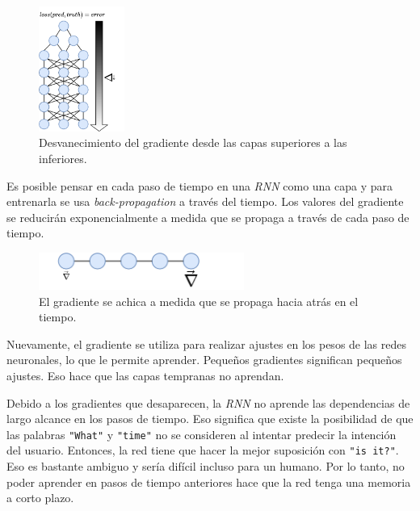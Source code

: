 \documentclass[a4paper,12pt]{article}
\begin{document}
\begin{figure}[H]
	\begin{center}				
		\includegraphics[width=0.25\textwidth]{vanishing4.png}
		\caption{Desvanecimiento del gradiente desde las capas superiores a las inferiores.}
		\label{fig:rnnvanishing4}
	\end{center}
\end{figure}

Es posible pensar en cada paso de tiempo en una \textit{RNN} como una capa y para entrenarla se usa \textit{back-propagation} a través del tiempo. Los valores del gradiente se reducirán exponencialmente a medida que se propaga a través de cada paso de tiempo.

\begin{figure}[H]
	\begin{center}				
		\includegraphics[width=0.6\textwidth]{vanishing5.png}
		\caption{El gradiente se achica a medida que se propaga hacia atrás en el tiempo.}
		\label{fig:rnnvanishing5}
	\end{center}
\end{figure}

Nuevamente, el gradiente se utiliza para realizar ajustes en los pesos de las redes neuronales, lo que le permite aprender. Pequeños gradientes significan pequeños ajustes. Eso hace que las capas tempranas no aprendan.

Debido a los gradientes que desaparecen, la \textit{RNN} no aprende las dependencias de largo alcance en los pasos de tiempo. Eso significa que existe la posibilidad de que las palabras \texttt{"What"} y \texttt{"time"} no se consideren al intentar predecir la intención del usuario. Entonces, la red tiene que hacer la mejor suposición con \texttt{"is it?"}. Eso es bastante ambiguo y sería difícil incluso para un humano. Por lo tanto, no poder aprender en pasos de tiempo anteriores hace que la red tenga una memoria a corto plazo.
\end{document}
